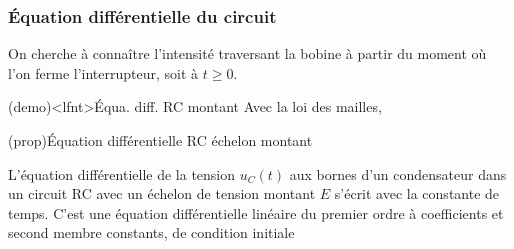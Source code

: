 \documentclass[../../main/main.tex]{subfiles}
\begin{document}
\subsubsection{Équation différentielle du circuit}
On cherche à connaître l'intensité traversant la bobine à partir du moment où
l'on ferme l'interrupteur, soit à $t \geq 0$.
\begin{tcb}[label=demo:eqdiffrc](demo)<lfnt>{Équa. diff. RC montant}
	Avec la loi des mailles,
	\vspace{-15pt}
\end{tcb}
\begin{tcb}[label=prop:eqdiffrc, sidebyside, righthand ratio=.4](prop){Équation
			différentielle RC échelon montant}

	L'équation différentielle de la tension $u_C(t)$ aux bornes d'un condensateur
	dans un circuit RC avec un échelon de tension montant $E$ s'écrit
	\psw{
		\[
			\boxed{\dv{u_C}{t} + \frac{1}{\tau}u_C = \frac{E}{\tau}}
		\]
	}
	avec  la constante de temps.
	\tcblower
	C'est une équation différentielle linéaire du premier ordre à
	coefficients et second membre constants, de condition initiale
	\psw{
		\[
			\boxed{u_C(0^-) = u_C(0^+) = 0}
		\]
	}
\end{tcb}
\end{document}
